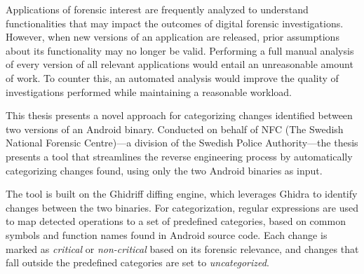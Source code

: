\noindent
Applications of forensic interest are frequently analyzed to understand functionalities that may impact the outcomes of digital forensic investigations. However, when new versions of an application are released, prior assumptions about its functionality may no longer be valid. Performing a full manual analysis of every version of all relevant applications would entail an unreasonable amount of work. To counter this, an automated analysis would improve the quality of investigations performed while maintaining a reasonable workload.

This thesis presents a novel approach for categorizing changes identified between two versions of an Android binary. Conducted on behalf of NFC (The Swedish National Forensic Centre)—a division of the Swedish Police Authority—the thesis presents a tool that streamlines the reverse engineering process by automatically categorizing changes found, using only the two Android binaries as input.

The tool is built on the Ghidriff diffing engine, which leverages Ghidra to identify changes between the two binaries. For categorization, regular expressions are used to map detected operations to a set of predefined categories, based on common symbols and function names found in Android source code. Each change is marked as \textit{critical} or \textit{non-critical} based on its forensic relevance, and changes that fall outside the predefined categories are set to \textit{uncategorized}.

